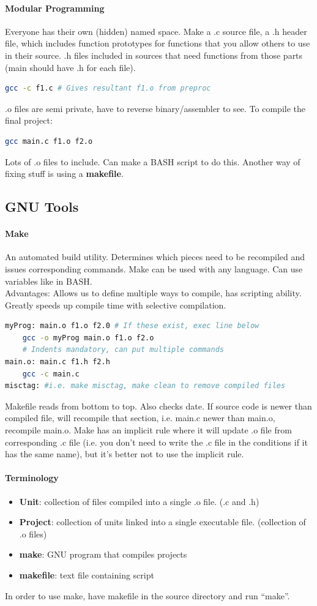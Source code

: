 \documentclass[12 pt]{article}
\begin{document}
\paragraph{Modular Programming} Everyone has their own (hidden) named space. Make a .c source file, a .h header file, which includes function prototypes for functions that you allow others to use in their source. .h files included in sources that need functions from those parts (main should have .h for each file).
\begin{lstlisting}[language=bash]
gcc -c f1.c # Gives resultant f1.o from preproc
\end{lstlisting}
.o files are semi private, have to reverse binary/assembler to see. To compile the final project:
\begin{lstlisting}[language=bash]
gcc main.c f1.o f2.o
\end{lstlisting}
Lots of .o files to include. Can make a BASH script to do this. Another way of fixing stuff is using a \textbf{makefile}.

\subsection{GNU Tools}
\paragraph{Make} An automated build utility. Determines which pieces need to be recompiled and issues corresponding commands. Make can be used with any language. Can use variables like in BASH.
\\ Advantages: Allows us to define multiple ways to compile, has scripting ability. Greatly speeds up compile time with selective compilation. 
\begin{lstlisting}[language=bash]
myProg: main.o f1.o f2.0 # If these exist, exec line below
    gcc -o myProg main.o f1.o f2.o
    # Indents mandatory, can put multiple commands
main.o: main.c f1.h f2.h
    gcc -c main.c
misctag: #i.e. make misctag, make clean to remove compiled files
\end{lstlisting}
Makefile reads from bottom to top. Also checks date. If source code is newer than compiled file, will recompile that section, i.e. main.c newer than main.o, recompile main.o. Make has an implicit rule where it will update .o file from corresponding .c file (i.e. you don't need to write the .c file in the conditions if it has the same name), but it's better not to use the implicit rule.
\paragraph{Terminology}
\begin{itemize}
\item 
\textbf{Unit}: collection of files compiled into a single .o file. (.c and .h)
\item 
\textbf{Project}: collection of units linked into a single executable file. (collection of .o files)
\item \textbf{make}: GNU program that compiles projects
\item \textbf{makefile}: text file containing script
\end{itemize}
In order to use make, have makefile in the source directory and run ``make''.
\end{document}

